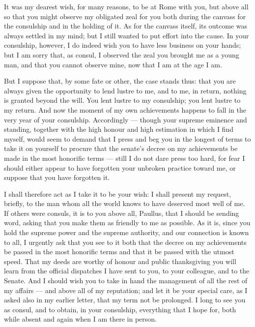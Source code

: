 

 It was my dearest wish, for many reasons, to be at Rome with you, but above all so that you might observe my obligated zeal for you both during the canvass for the consulship and in the holding of it. As for the canvass itself, its outcome was always settled in my mind; but I still wanted to put effort into the cause. In your consulship, however, I do indeed wish you to have less business on your hands; but I am sorry that, as consul, I observed the zeal you brought me as a young man, and that you cannot observe mine, now that I am at the age I am.

 But I suppose that, by some fate or other, the case stands thus: that you are always given the opportunity to lend lustre to me, and to me, in return, nothing is granted beyond the will. You lent lustre to my consulship; you lent lustre to my return. And now the moment of my own achievements happens to fall in the very year of your consulship. Accordingly --- though your supreme eminence and standing, together with the high honour and high estimation in which I find myself, would seem to demand that I press and beg you in the longest of terms to take it on yourself to procure that the senate's decree on my achievements be made in the most honorific terms --- still I do not dare press too hard, for fear I should either appear to have forgotten your unbroken practice toward me, or suppose that you have forgotten it.

 I shall therefore act as I take it to be your wish: I shall present my request, briefly, to the man whom all the world knows to have deserved most well of me. If others were consuls, it is to you above all, Paullus, that I should be sending word, asking that you make them as friendly to me as possible. As it is, since you hold the supreme power and the supreme authority, and our connection is known to all, I urgently ask that you see to it both that the decree on my achievements be passed in the most honorific terms and that it be passed with the utmost speed. That my deeds are worthy of honour and public thanksgiving you will learn from the official dispatches I have sent to you, to your colleague, and to the Senate. And I should wish you to take in hand the management of all the rest of my affairs --- and above all of my reputation; and let it be your special care, as I asked also in my earlier letter, that my term not be prolonged. I long to see you as consul, and to obtain, in your consulship, everything that I hope for, both while absent and again when I am there in person.
